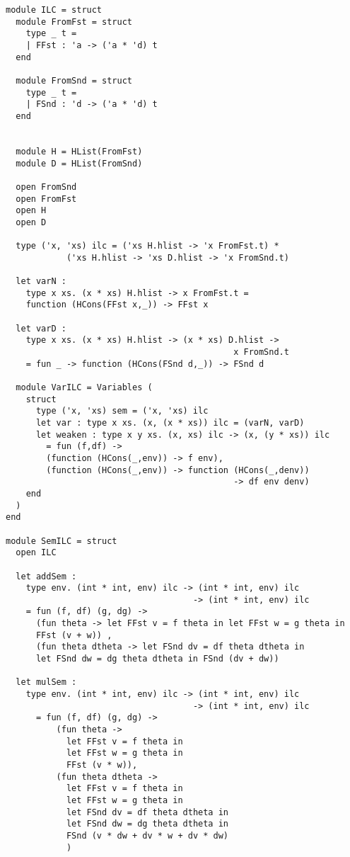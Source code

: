\documentclass[uplatex]{sumiilab-paper}
\theoremstyle{mystyle}
\numberwithin{definition}{chapter} %
\begin{document}
\begin{lstlisting}[caption=ILCの埋め込み,label=src:ilc_unembedding]
  module ILC = struct 
  module FromFst = struct 
    type _ t = 
    | FFst : 'a -> ('a * 'd) t  
  end 

  module FromSnd = struct 
    type _ t = 
    | FSnd : 'd -> ('a * 'd) t  
  end 


  module H = HList(FromFst)
  module D = HList(FromSnd)

  open FromSnd
  open FromFst
  open H 
  open D 

  type ('x, 'xs) ilc = ('xs H.hlist -> 'x FromFst.t) * 
            ('xs H.hlist -> 'xs D.hlist -> 'x FromSnd.t)

  let varN : 
    type x xs. (x * xs) H.hlist -> x FromFst.t = 
    function (HCons(FFst x,_)) -> FFst x  

  let varD : 
    type x xs. (x * xs) H.hlist -> (x * xs) D.hlist -> 
                                             x FromSnd.t 
    = fun _ -> function (HCons(FSnd d,_)) -> FSnd d 

  module VarILC = Variables (
    struct 
      type ('x, 'xs) sem = ('x, 'xs) ilc 
      let var : type x xs. (x, (x * xs)) ilc = (varN, varD) 
      let weaken : type x y xs. (x, xs) ilc -> (x, (y * xs)) ilc 
        = fun (f,df) -> 
        (function (HCons(_,env)) -> f env), 
        (function (HCons(_,env)) -> function (HCons(_,denv)) 
                                             -> df env denv) 
    end 
  )
end

module SemILC = struct
  open ILC

  let addSem : 
    type env. (int * int, env) ilc -> (int * int, env) ilc 
                                     -> (int * int, env) ilc 
    = fun (f, df) (g, dg) -> 
      (fun theta -> let FFst v = f theta in let FFst w = g theta in 
      FFst (v + w)) , 
      (fun theta dtheta -> let FSnd dv = df theta dtheta in 
      let FSnd dw = dg theta dtheta in FSnd (dv + dw))

  let mulSem : 
    type env. (int * int, env) ilc -> (int * int, env) ilc 
                                     -> (int * int, env) ilc
      = fun (f, df) (g, dg) -> 
          (fun theta -> 
            let FFst v = f theta in 
            let FFst w = g theta in 
            FFst (v * w)),
          (fun theta dtheta -> 
            let FFst v = f theta in 
            let FFst w = g theta in
            let FSnd dv = df theta dtheta in 
            let FSnd dw = dg theta dtheta in 
            FSnd (v * dw + dv * w + dv * dw) 
            )


\end{lstlisting}
\end{document}
